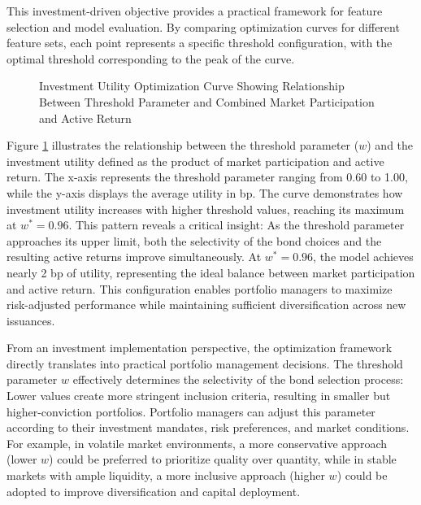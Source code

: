 This investment-driven objective provides a practical framework for feature selection and model evaluation. By comparing optimization curves for different feature sets, each point represents a specific threshold configuration, with the optimal threshold corresponding to the peak of the curve.

\begin{figure}[h]
    \begin{center}
        
    \end{center}
    \caption{Investment Utility Optimization Curve Showing Relationship Between Threshold Parameter and Combined Market Participation and Active Return}
    \label{fig:optimization_curve}
\end{figure}

Figure \ref{fig:optimization_curve} illustrates the relationship between the threshold parameter ($w$) and the investment utility defined as the product of market participation and active return. The x-axis represents the threshold parameter ranging from 0.60 to 1.00, while the y-axis displays the average utility in bp. The curve demonstrates how investment utility increases with higher threshold values, reaching its maximum at $w^* = 0.96$. This pattern reveals a critical insight: As the threshold parameter approaches its upper limit, both the selectivity of the bond choices and the resulting active returns improve simultaneously. At $w^* = 0.96$, the model achieves nearly 2 bp of utility, representing the ideal balance between market participation and active return. This configuration enables portfolio managers to maximize risk-adjusted performance while maintaining sufficient diversification across new issuances.

From an investment implementation perspective, the optimization framework directly translates into practical portfolio management decisions. The threshold parameter $w$ effectively determines the selectivity of the bond selection process: Lower values create more stringent inclusion criteria, resulting in smaller but higher-conviction portfolios. Portfolio managers can adjust this parameter according to their investment mandates, risk preferences, and market conditions. For example, in volatile market environments, a more conservative approach (lower $w$) could be preferred to prioritize quality over quantity, while in stable markets with ample liquidity, a more inclusive approach (higher $w$) could be adopted to improve diversification and capital deployment.

